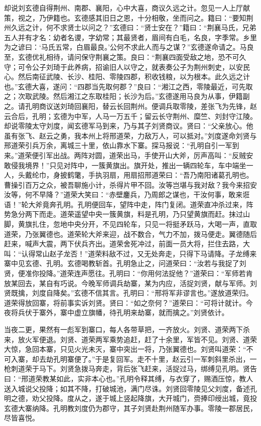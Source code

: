 却说刘玄德自得荆州、南郡、襄阳，心中大喜，商议久远之计。忽见一人上厅献策，视之，乃伊籍也。玄德感其旧日之恩，十分相敬，坐而问之。籍曰：“要知荆州久远之计，何不求贤士以问之？”玄德曰：“贤士安在？”籍曰：“荆襄马氏，兄弟五人并有才名：幼者名谡，字幼常；其最贤者，眉间有白毛，名良，字季常。乡里为之谚曰：‘马氏五常，白眉最良。’公何不求此人而与之谋？”玄德遂命请之。马良至，玄德优礼相待，请问保守荆襄之策。良曰：“荆襄四面受敌之地，恐不可久守；可令公子刘琦于此养病，招谕旧人以守之，就表奏公子为荆州刺史，以安民心。然后南征武陵、长沙、桂阳、零陵四郡，积收钱粮，以为根本。此久远之计也。”玄德大喜，遂问：“四郡当先取何郡？”良曰：“湘江之西，零陵最近，可先取之；次取武陵。然后湘江之东取桂阳；长沙为后。”玄德遂用马良为从事，伊籍副之。请孔明商议送刘琦回襄阳，替云长回荆州。便调兵取零陵，差张飞为先锋，赵云合后，孔明；玄德为中军，人马一万五千；留云长守荆州、糜竺、刘封守江陵。却说零陵太守刘度，闻玄德军马到来，乃与其子刘贤商议。贤曰：“父亲放心。他虽有张飞、赵云之勇，我本州上将邢道荣，力敌万人，可以抵对。”刘度遂命刘贤与邢道荣引兵万余，离城三十里，依山靠水下寨。探马报说：“孔明自引一军到来。”道荣便引军出战。两阵对圆，道荣出马，手使开山大斧，厉声高叫：“反贼安敢侵我境界！”只见对阵中，一簇黄旗出。旗开处，推出一辆四轮车，车中端坐一人，头戴纶巾，身披鹤氅，手执羽扇，用扇招邢道荣曰：“吾乃南阳诸葛孔明也。曹操引百万之众，被吾聊施小计，杀得片甲不回。汝等岂堪与我对敌？我今来招安汝等，何不早降？”道荣大笑曰：“赤壁鏖兵，乃周郎之谋也，干汝何事，敢来诳语！”轮大斧竟奔孔明。孔明便回车，望阵中走，阵门复闭。道荣直冲杀过来，阵势急分两下而走。道荣遥望中央一簇黄旗，料是孔明，乃只望黄旗而赶。抹过山脚，黄旗扎住，忽地中央分开，不见四轮车，只见一将挺矛跃马，大喝一声，直取道荣，乃张翼德也。道荣轮大斧来迎，战不数合，气力不加，拨马便走。翼德随后赶来，喊声大震，两下伏兵齐出。道荣舍死冲过，前面一员大将，拦住去路，大叫：“认得常山赵子龙否！”道荣料敌不过，又无处奔走，只得下马请降。子龙缚来寨中见玄德、孔明。玄德喝教斩首。孔明急止之，问道荣曰：“汝若与我捉了刘贤，便准你投降。”道荣连声愿往。孔明曰：“你用何法捉他？”道荣曰：“军师若肯放某回去，某自有巧说。今晚军师调兵劫寨，某为内应，活捉刘贤，献与军师。刘贤既擒，刘度自降矣。”玄德不信其言。孔明曰：“邢将军非谬言也。”遂放道荣归。道荣得放回寨，将前事实诉刘贤。贤曰：“如之奈何？”道荣曰：“可将计就计。今夜将兵伏于寨外，寨中虚立旗幡，待孔明来劫寨，就而擒之。”刘贤依计。

当夜二更，果然有一彪军到寨口，每人各带草把，一齐放火。刘贤、道荣两下杀来，放火军便退。刘贤、道荣两军乘势追赶，赶了十余里，军皆不见。刘贤、道荣大惊，急回本寨，只见火光未灭，寨中突出一将，乃张翼德也。刘贤叫道荣：“不可入寨，却去劫孔明寨便了。”于是复回军。走不十里，赵云引一军刺斜里杀出，一枪刺道荣于马下。刘贤急拨马奔走，背后张飞赶来，活捉过马，绑缚见孔明。贤告曰：“邢道荣教某如此，实非本心也。”孔明令释其缚，与衣穿了，赐酒压惊，教人送入城说父投降；如其不降，打破城池，满门尽诛。刘贤回零陵见父刘度，备述孔明之德，劝父投降。度从之，遂于城上竖起降旗，大开城门，赍捧印绶出城，竟投玄德大寨纳降。孔明教刘度仍为郡守，其子刘贤赴荆州随军办事。零陵一郡居民，尽皆喜悦。

